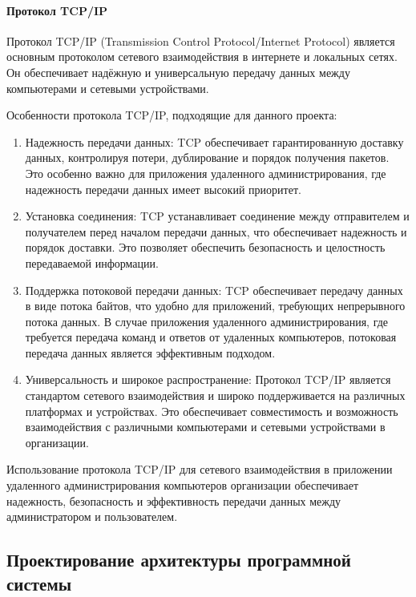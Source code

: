 \paragraph{Протокол TCP/IP}

Протокол TCP/IP (Transmission Control Protocol/Internet Protocol) является основным протоколом сетевого взаимодействия в интернете и локальных сетях. Он обеспечивает надёжную и универсальную передачу данных между компьютерами и сетевыми устройствами.

Особенности протокола TCP/IP, подходящие для данного проекта:
\begin{enumerate}
	\item Надежность передачи данных: TCP обеспечивает гарантированную доставку данных, контролируя потери, дублирование и порядок получения пакетов. Это особенно важно для приложения удаленного администрирования, где надежность передачи данных имеет высокий приоритет.

	\item Установка соединения: TCP устанавливает соединение между отправителем и получателем перед началом передачи данных, что обеспечивает надежность и порядок доставки. Это позволяет обеспечить безопасность и целостность передаваемой информации.

	\item Поддержка потоковой передачи данных: TCP обеспечивает передачу данных в виде потока байтов, что удобно для приложений, требующих непрерывного потока данных. В случае приложения удаленного администрирования, где требуется передача команд и ответов от удаленных компьютеров, потоковая передача данных является эффективным подходом.

	\item Универсальность и широкое распространение: Протокол TCP/IP является стандартом сетевого взаимодействия и широко поддерживается на различных платформах и устройствах. Это обеспечивает совместимость и возможность взаимодействия с различными компьютерами и сетевыми устройствами в организации.
\end{enumerate}

Использование протокола TCP/IP для сетевого взаимодействия в приложении удаленного администрирования компьютеров организации обеспечивает надежность, безопасность и эффективность передачи данных между администратором и пользователем.

\subsection{Проектирование архитектуры программной системы}

